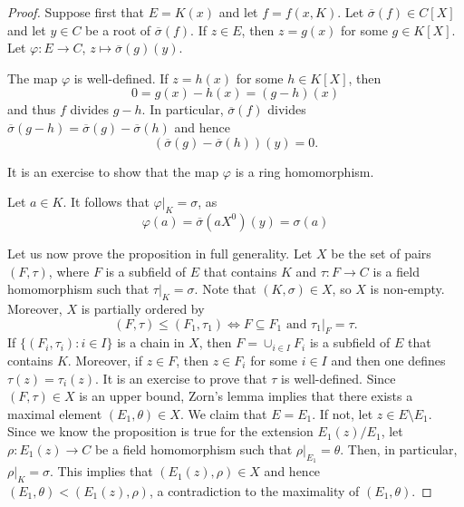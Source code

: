 \begin{proof}
	Suppose first that $E=K(x)$ and let $f=f(x,K)$. Let $\overline{\sigma}(f)\in C[X]$ 
	and let $y\in C$ be a root of $\overline{\sigma}(f)$. If $z\in E$, then $z=g(x)$ for
	some $g\in K[X]$. Let $\varphi\colon E\to C$, $z\mapsto \overline{\sigma}(g)(y)$. 

	The map $\varphi$ is well-defined. If $z=h(x)$ for some $h\in K[X]$, then
	\[
	0=g(x)-h(x)=(g-h)(x)
	\]
	and thus $f$ divides $g-h$. In particular, $\overline{\sigma}(f)$ divides
    $\overline{\sigma}(g-h)=\overline{\sigma}(g)-\overline{\sigma}(h)$ and hence
    \[
    (\overline{\sigma}(g)-\overline{\sigma}(h))(y)=0.
    \]

	It is an exercise to show that the map $\varphi$ is a ring homomorphism.
	
	Let $a\in K$. It follows that $\varphi|_K=\sigma$, as 
	\[
	\varphi(a)=\overline{\sigma}(aX^0)(y)=\sigma(a)
	\]
	
	Let us now prove the proposition in full generality. Let 
	$X$ be the set of pairs $(F,\tau)$, where $F$ is a subfield of $E$ that contains $K$ and
	$\tau\colon F\to C$ is a field homomorphism such that $\tau|_K=\sigma$. Note that
	$(K,\sigma)\in X$, so $X$ is non-empty. Moreover, $X$ is partially ordered by
	\[
	(F,\tau)\leq (F_1,\tau_1)\Longleftrightarrow F\subseteq F_1\text{ and }\tau_1|_F=\tau.
	\]
	If $\{(F_i,\tau_i):i\in I\}$ is a chain in $X$, then $F=\cup_{i\in I}F_i$ is a subfield of $E$
	that contains $K$. Moreover, if $z\in F$, then $z\in F_i$ for some $i\in I$ and 
	then one defines $\tau(z)=\tau_i(z)$. It is an exercise to prove that $\tau$ is well-defined.
	Since $(F,\tau)\in X$ is an upper bound, Zorn's lemma implies that there exists
	a maximal element 
	$(E_1,\theta)\in X$. We claim that $E=E_1$. If not, let $z\in E\setminus E_1$. 
	Since we know the proposition is true for the extension $E_1(z)/E_1$, 
	let  
	$\rho\colon E_1(z)\to C$ be a field homomorphism such that $\rho|_{E_1}=\theta$. Then, in particular, 
	$\rho|_K=\sigma$. This implies that $(E_1(z),\rho)\in X$ and hence
	$(E_1,\theta)<(E_1(z),\rho)$, a contradiction to the maximality of $(E_1,\theta)$. 
\end{proof}

